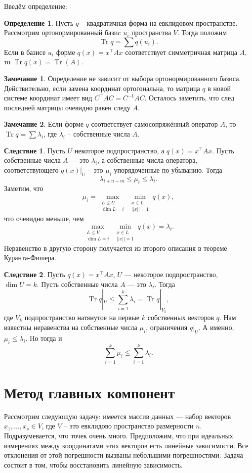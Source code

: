\documentclass[10pt,a4paper,oneside]{book}
\theoremstyle{definition}
\newtheorem*{rem}{Замечание}
\newtheorem*{defn}{{\color{yellow!30!red} Определение}}
\newtheorem{cor}{Следствие}
\newcommand{\Tr}{\operatorname{Tr}}
\def\dfn{\begin{defn}}
\def\edfn{\end{defn}}
\def\crl{\begin{cor}}
\def\ecrl{\end{cor}}
\def\rm{\begin{rem}}
\def\erm{\end{rem}}
\begin{document}
Введём определение:
\dfn
Пусть $q$ -- квадратичная форма на евклидовом пространстве. Рассмотрим ортонормированный базиc $u_i$ пространства $V$. Тогда положим 
$$\Tr q= \sum q(u_i).$$ Если в базисе $u_i$ форме $q(x)=x^{\top} Ax $ соответствует симметричная матрица $A$, то $\Tr q(x)=\Tr(A)$.
\edfn

\rm Определение не зависит от выбора ортонормированного базиса. Действительно, если замена координат ортогональна, то матрица $q$ в новой системе координат имеет вид $C^{\top}AC=C^{-1}AC$. Осталось заметить, что след последней матрицы очевидно равен следу $A$.
\erm

\rm Если форме $q$ соответствует самосопряжённый оператор $A$, то $\Tr q=\sum \lambda_i$, где $\lambda_i$ -- собственные числа $A$.
\erm

\crl Пусть $U$ некоторое подпространство, а $q(x)=x^{\top} Ax$. Пусть собственные числа $A$ --- это $\lambda_i$, а собственные числа оператора, соответствующего $q(x)|_U$ -- это $\mu_i$ упорядоченные по убыванию. Тогда 
$$\lambda_{i+n-m}\leq \mu_i\leq \lambda_i.$$  
\proof Заметим, что
 $$\mu_i=\max_{\substack{L\leq U\\ \dim L=i}} \min_{\substack{ x\in L \\ ||x||=1}} q(x),$$
что очевидно меньше, чем 
$$\max_{\substack{L\leq V\\ \dim L=i}} \min_{\substack{ x\in L \\ ||x||=1}} q(x)=\lambda_i.$$ Неравенство в другую сторону получается из второго описания в теореме Куранта-Фишера.
\endproof
\ecrl




\crl Пусть $q(x)=x^{\top} Ax$, $U$ --- некоторое подпространство, $\dim U=k$. Пусть собственные числа $A$ --- это $\lambda_i$. Тогда $$\Tr q|_U\leq \sum_{i=1}^k \lambda_i= \Tr q|_{V_k},$$
где $V_k$ подпространство натянутое на первые $k$ собственных векторов $q$.
\proof Нам известны неравенства на собственные числа $\mu_i$, ограничения $q|_U$. А именно, $\mu_i\leq \lambda_i$. Но тогда и $$\sum_{i=1}^k \mu_i \leq \sum_{i=1}^k \lambda_i.$$
\endproof
\ecrl 








\section{Метод главных компонент}

Рассмотрим следующую задачу: имеется массив данных --- набор векторов $x_1,\dots,x_s \in V$, где $V$ -- это евклидово пространство размерности $n$. Подразумевается, что точек очень много. Предположим, что при идеальных измерениях между координатами этих векторов есть линейные зависимости. Все отклонения от этой погрешности вызваны небольшими погрешностями. Задача состоит в том, чтобы восстановить линейную зависимость. 
\end{document}
